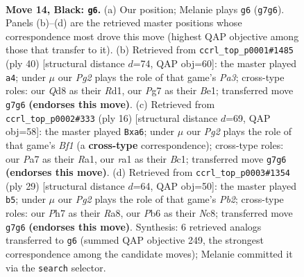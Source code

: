 \documentclass[11pt]{article}
\begin{document}
\begin{figure}[p]\centering
\begin{subfigure}{0.46\textwidth}\centering
\resizebox{\linewidth}{!}{%
\newchessgame
\chessboard[
  setfen={rnbqk2r/p3b1pp/1pp4P/3p1pP1/P2P1P2/2N1P3/1P6/R2QKBNR b KQkq - 0 14},
  showmover=false,
  pgfstyle=straightmove, color=movearrow, markmove={g7-g6}
]}
\caption{}
\end{subfigure}\hfill
\begin{subfigure}{0.46\textwidth}\centering
\resizebox{\linewidth}{!}{%
\newchessgame
\chessboard[
  setfen={1r1qr1kb/3p1p1p/p1nP2pP/2p5/1p2P3/P3P3/1PQ2P2/1K1RBB1R w - - 0 21},
  showmover=false,
  pgfstyle=straightmove, color=movearrow, markmove={a3-a4}
]}
\caption{}
\end{subfigure}
\\[4pt]
\begin{subfigure}{0.46\textwidth}\centering
\resizebox{\linewidth}{!}{%
\newchessgame
\chessboard[
  setfen={rn2k1nr/p2q1ppp/bp2p3/2ppP3/P2P3P/2P5/2P2PP1/R1BQKBNR w KQkq - 1 9},
  showmover=false,
  pgfstyle=straightmove, color=movearrow, markmove={f1-a6}
]}
\caption{}
\end{subfigure}\hfill
\begin{subfigure}{0.46\textwidth}\centering
\resizebox{\linewidth}{!}{%
\newchessgame
\chessboard[
  setfen={r1nq1k1r/ppb2p2/P1p2pp1/3p3p/3P3P/3NP1P1/1PPN1P2/R2QK2R b KQ - 0 15},
  showmover=false,
  pgfstyle=straightmove, color=movearrow, markmove={b7-b5}
]}
\caption{}
\end{subfigure}
\caption{\textbf{Move 14, Black: \texttt{g6}.} (a) Our position; Melanie plays \texttt{g6} (\texttt{g7g6}). Panels (b)--(d) are the retrieved master positions whose correspondence most drove this move (highest QAP objective among those that transfer to it). (b) Retrieved from \texttt{ccrl\_top\_p0001\#1485} (ply 40) [structural distance $d$=74, QAP obj=60]: the master played \texttt{a4}; under $\mu$ our \emph{Pg2} plays the role of that game's \emph{Pa3}; cross-type roles: our \emph{Q}d8 as their \emph{R}d1, our \emph{P}g7 as their \emph{B}e1; transferred move \texttt{g7g6} \textbf{(endorses this move)}. (c) Retrieved from \texttt{ccrl\_top\_p0002\#333} (ply 16) [structural distance $d$=69, QAP obj=58]: the master played \texttt{Bxa6}; under $\mu$ our \emph{Pg2} plays the role of that game's \emph{Bf1} (a \textbf{cross-type} correspondence); cross-type roles: our \emph{P}a7 as their \emph{R}a1, our \emph{r}a1 as their \emph{B}c1; transferred move \texttt{g7g6} \textbf{(endorses this move)}. (d) Retrieved from \texttt{ccrl\_top\_p0003\#1354} (ply 29) [structural distance $d$=64, QAP obj=50]: the master played \texttt{b5}; under $\mu$ our \emph{Pg2} plays the role of that game's \emph{Pb2}; cross-type roles: our \emph{P}h7 as their \emph{R}a8, our \emph{P}b6 as their \emph{N}c8; transferred move \texttt{g7g6} \textbf{(endorses this move)}. Synthesis: 6 retrieved analogs transferred to \texttt{g6} (summed QAP objective 249, the strongest correspondence among the candidate moves); Melanie committed it via the \texttt{search} selector.}
\label{fig:thought-m27}
\end{figure}
\end{document}
